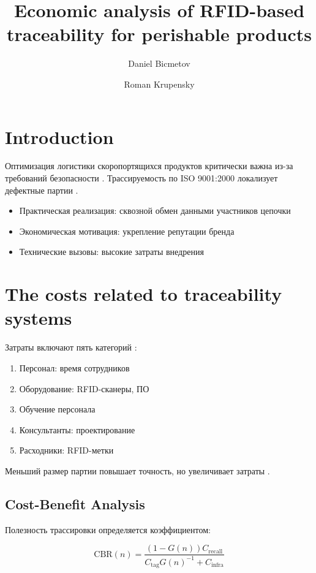 \documentclass[fleqn,10pt,russian]{olplainarticle-class}
\title{Economic analysis of RFID-based traceability for perishable products}
\author[1]{Daniel Bicmetov}
\author[2]{Roman Krupensky}
\affil[1]{Samara National Research University, Samara, Russia}
\begin{document}
\flushbottom
\maketitle
\thispagestyle{empty}

\section*{Introduction}

Оптимизация логистики скоропортящихся продуктов критически важна из-за требований безопасности \cite{Alarcos1999}. Трассируемость по ISO 9001:2000 локализует дефектные партии \cite{ArslanHansen1996}.

\begin{itemize}
\item Практическая реализация: сквозной обмен данными участников цепочки
\item Экономическая мотивация: укрепление репутации бренда \cite{WangEtAl2015}
\item Технические вызовы: высокие затраты внедрения \cite{BartkovaJouvet1999}
\end{itemize}

\section*{The costs related to traceability systems}

Затраты включают пять категорий \cite{BartkovaJouvet1999}:

\begin{enumerate}
\item Персонал: время сотрудников
\item Оборудование: RFID-сканеры, ПО
\item Обучение персонала
\item Консультанты: проектирование
\item Расходники: RFID-метки
\end{enumerate}

Меньший размер партии повышает точность, но увеличивает затраты \cite{Mitchell2001}.

\subsection*{Cost-Benefit Analysis}

Полезность трассировки определяется коэффициентом:

\begin{equation}
\text{CBR}(n)=\frac{(1-G(n))C_{\text{recall}}}{C_{\text{tag}}G(n)^{-1}+C_{\text{infra}}}
\label{eq:cbr}
\end{equation}
\end{document}
